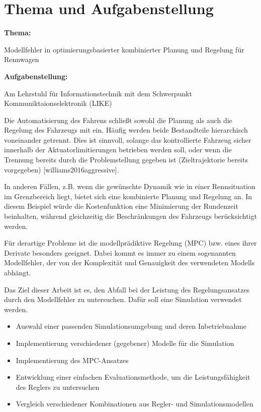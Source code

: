  

\chapter*{Thema und Aufgabenstellung}
\textbf{Thema:}\par\smallskip

 Modellfehler in optimierungsbasierter kombinierter Planung und Regelung für Rennwagen

\par\bigskip
\textbf{Aufgabenstellung:}\par\smallskip
Am Lehrstuhl für Informationstechnik mit dem Schwerpunkt Kommuniktaionselektronik (LIKE)
\par\smallskip  
Die Automatisierung des Fahrens schließt sowohl die Planung als auch die Regelung des Fahrzeugs mit ein. Häufig werden beide Bestandteile hierarchisch voneinander getrennt. Dies ist sinnvoll, solange das kontrollierte Fahrzeug sicher innerhalb der Aktuatorlimitierungen betrieben werden soll, oder wenn die Trennung bereits durch die Problemstellung gegeben ist (Zieltrajektorie bereits vorgegeben) [williams2016aggressive].  

In anderen Fällen, z.B. wenn die gewünschte Dynamik wie in einer Rennsituation im Grenzbereich liegt, bietet sich eine kombinierte Planung und Regelung an. In diesem Beispiel würde die Kostenfunktion eine Minimierung der Rundenzeit beinhalten, während gleichzeitig die Beschränkungen des Fahrzeugs berücksichtigt werden.

Für derartige Probleme ist die modellprädiktive Regelung (MPC) bzw. eines ihrer Derivate besonders geeignet. Dabei kommt es immer zu einem sogenannten Modellfehler, der von der Komplexität und Genauigkeit des verwendeten Modells abhängt.

Das Ziel dieser Arbeit ist es, den Abfall bei der Leistung des Regelungsansatzes durch den Modellfehler zu untersuchen. Dafür soll eine Simulation verwendet werden.

\begin{itemize}
\item Auswahl einer passenden Simulationsumgebung und deren Inbetriebnahme
\item Implementierung verschiedener (gegebener) Modelle für die Simulation
\item Implementierung des MPC-Ansatzes
\item Entwicklung einer einfachen Evaluationsmethode, um die Leistungsfähigkeit des Reglers zu untersuchen
\item Vergleich verschiedener Kombinationen aus Regler- und Simulationsmodellen
\end{itemize}
